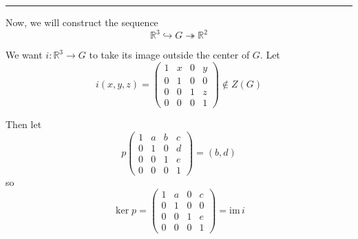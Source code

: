 \documentclass[12pt]{article}
\newcommand{\R}{\mathbb{R}}
\newcommand{\im}{\text{im}\,}
\begin{document}
        \vspace*{10pt}
        \hrule 
        \vspace*{10pt}

        Now, we will construct the sequence
        \[\R^3 \hookrightarrow G \twoheadrightarrow \R^2\]

        We want $i: \R^3 \to G$ to take its image outside the center of $G$. Let 
        \[i(x, y, z) = \begin{pmatrix}
            1 & x & 0 & y\\ 
            0 & 1 & 0 & 0\\
            0 & 0 & 1 & z\\
            0 & 0 & 0 & 1
        \end{pmatrix} \notin Z(G)\]

        Then let
        \[p\begin{pmatrix}
            1 & a & b & c\\ 
            0 & 1 & 0 & d\\
            0 & 0 & 1 & e\\
            0 & 0 & 0 & 1
        \end{pmatrix} = (b, d)\]
        so 
        \[\ker p = \begin{pmatrix}
            1 & a & 0 & c\\ 
            0 & 1 & 0 & 0\\
            0 & 0 & 1 & e\\
            0 & 0 & 0 & 1
        \end{pmatrix} = \im i\] 
\end{document}
